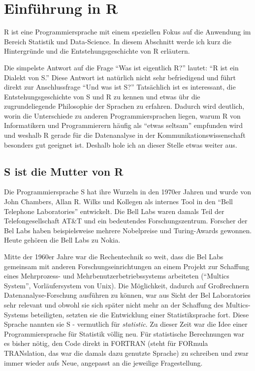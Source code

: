 \documentclass[
]{book}
\begin{document}
\hypertarget{einfuxfchrung-in-r}{%
\section{Einführung in R}\label{einfuxfchrung-in-r}}

R ist eine Programmiersprache mit einem speziellen Fokus auf die Anwendung im Bereich Statistik und Data-Science. In diesem Abschnitt werde ich kurz die Hintergründe und die Entstehungsgeschichte von R erläutern.

Die simpelste Antwort auf die Frage ``Was ist eigentlich R?'' lautet: ``R ist ein Dialekt von S.'' \citep{Peng_2020}
Diese Antwort ist natürlich nicht sehr befriedigend und führt direkt zur Anschlussfrage
``Und was ist S?'' Tatsächlich ist es interessant, die Entstehungsgeschichte von S und R zu kennen und etwas übr die zugrundeliegende Philosophie der Sprachen zu erfahren.
Dadurch wird deutlich, worin die Unterschiede zu anderen Programmiersprachen liegen, warum
R von Informatikern und Programmierern häufig als ``etwas seltsam'' empfunden wird und weshalb R gerade
für die Datenanalyse in der Kommunikationswissenschaft besonders gut geeignet ist.
Deshalb hole ich an dieser Stelle etwas weiter aus.

\hypertarget{s-ist-die-mutter-von-r}{%
\subsection{S ist die Mutter von R}\label{s-ist-die-mutter-von-r}}

Die Programmiersprache S hat ihre Wurzeln in den 1970er Jahren und wurde von John Chambers,
Allan R. Wilks und Kollegen als internes Tool in den ``Bell Telephone Laboratories'' entwickelt.
Die Bell Labs waren damals Teil der Telefongesellschaft AT\&T und ein bedeutendes Forschungszentrum.
Forscher der Bel Labs haben beispielsweise mehrere Nobelpreise und Turing-Awards gewonnen.
Heute gehören die Bell Labs zu Nokia.

Mitte der 1960er Jahre war die Rechentechnik so weit, dass die Bel Labs gemeinsam mit anderen
Forschungseinrichtungen an einem Projekt zur Schaffung eines Mehrprozess- und Mehrbenutzerbetriebssystems arbeiteten (``Multics System'', Vorläufersystem von Unix).
Die Möglichkeit, dadurch auf Großrechnern Datenanalyse-Forschung ausführen zu können, war aus Sicht der Bel Laboratories sehr relevant und obwohl sie sich später nicht mehr an der Schaffung des Multics-Systems beteiligten, setzten sie die Entwicklung einer Statistiksprache fort. Diese Sprache nannten sie S - vermutlich für \emph{statistic}.
Zu dieser Zeit war die Idee einer Programmiersprache für Statistik völlig neu.
Für statistische Berechnungen war es bisher nötig, den Code direkt in FORTRAN (steht für FORmula TRANslation, das war die damals dazu genutzte Sprache) zu schreiben und zwar immer wieder aufs Neue, angepasst an die jeweilige Fragestellung.
\end{document}
